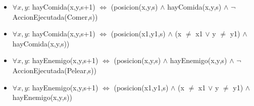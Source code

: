 \begin{itemize}
\item $\forall x,y$: hayComida(x,y,s+1) $\Leftrightarrow$
\newline (posicion(x,y,s) $\land$ hayComida(x,y,s) $\land$ $\lnot$AccionEjecutada(Comer,s))

\item $\forall x,y$: hayComida(x,y,s+1) $\Leftrightarrow$
\newline (posicion(x1,y1,s) $\land$ (x $\ne$ x1 $\lor$ y $\ne$ y1) $\land$ hayComida(x,y,s))



\item $\forall x,y$: hayEnemigo(x,y,s+1) $\Leftrightarrow$
\newline (posicion(x,y,s) $\land$ hayEnemigo(x,y,s) $\land$ $\lnot$AccionEjecutada(Pelear,s))

\item $\forall x,y$: hayEnemigo(x,y,s+1) $\Leftrightarrow$
\newline (posicion(x1,y1,s) $\land$ (x $\ne$ x1 $\lor$ y $\ne$ y1) $\land$ hayEnemigo(x,y,s))

\end{itemize}

